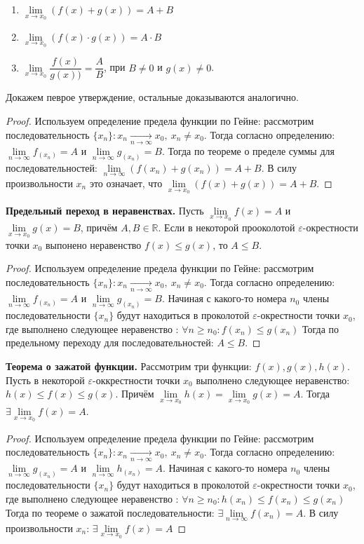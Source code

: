 \documentclass[12pt]{article}
\begin{document}
\begin{enumerate}
    \item $\lim\limits_{x \to x_0} (f(x) + g(x)) = A + B$
    \item $\lim\limits_{x \to x_0} (f(x) \cdot g(x)) = A \cdot B$
    \item $\lim\limits_{x \to x_0} \dfrac{f(x)}{g(x))} = \dfrac AB$, при $B \neq 0$ и $g(x) \neq 0$.
\end{enumerate}
Докажем певрое утверждение, остальные доказываются аналогично.
\begin{proof}
    Используем определение предела функции по Гейне: рассмотрим последовательность $\{x_n\} : x_n \xrightarrow[n \to \infty]{} x_0, \ x_n \neq x_0$. Тогда согласно определению: $\lim\limits_{n \to \infty} f_(x_n) = A$ и $\lim\limits_{n \to \infty} g_(x_n) = B$. Тогда по теореме о пределе суммы для последовательностей: $\lim\limits_{n \to \infty} \left(f(x_n) + g(x_n)\right) = A + B$. В силу произвольности $x_n$ это означает, что $\lim\limits_{x \to x_0} \left(f(x) + g(x) \right) = A + B$.
\end{proof}
\textbf{Предельный переход в неравенствах.} Пусть $\lim\limits_{x \to x_0} f(x) = A$ и $\lim\limits_{x \to x_0} g(x) = B$, причём $A, B \in \mathbb{R}$. Если в некоторой прооколотой $\varepsilon$-окрестности точки $x_0$ выпонено неравенство $f(x) \leq g(x)$, то $A \leq B$. 
\begin{proof}
    Используем определение предела функции по Гейне: рассмотрим последовательность $\{x_n\} : x_n \xrightarrow[n \to \infty]{} x_0, \ x_n \neq x_0$. Тогда согласно определению: $\lim\limits_{n \to \infty} f_(x_n) = A$ и $\lim\limits_{n \to \infty} g_(x_n) = B$. Начиная с какого-то номера $n_0$ члены последовательности $\{x_n\}$ будут находиться в проколотой $\varepsilon$-окрестности точки $x_0$, где выполнено следующее неравенство : $\forall n \geq n_0 : f(x_n) \leq g(x_n) $  Тогда по предельному переходу для последовательностей: $A \leq B$.
\end{proof}
\textbf{Теорема о зажатой функции.} Рассмотрим три функции: $f(x), g(x), h(x)$. Пусть в некоторой $\varepsilon$-оккрестности точки $x_0$ выполнено следующее неравенство: $h(x) \leq f(x) \leq g(x)$. Причём $\lim\limits_{x \to x_0} h(x) = \lim\limits_{x \to x_0} g(x) = A$. Тогда $\exists\lim\limits_{x \to x_0} f(x) = A$.
\begin{proof}
    Используем определение предела функции по Гейне: рассмотрим последовательность $\{x_n\} : x_n \xrightarrow[n \to \infty]{} x_0, \ x_n \neq x_0$. Тогда согласно определению: $\lim\limits_{n \to \infty} g_(x_n) = A$ и $\lim\limits_{n \to \infty} h_(x_n) = A$. Начиная с какого-то номера $n_0$ члены последовательности $\{x_n\}$ будут находиться в проколотой $\varepsilon$-окрестности точки $x_0$, где выполнено следующее неравенство : $\forall n \geq n_0 : h(x_n) \leq f(x_n) \leq g(x_n) $  Тогда по теореме о зажатой последовательности: $\exists \lim\limits_{n \to \infty} f(x_n) = A$. В силу произвольности $x_n$: $\exists \lim\limits_{x \to x_0} f(x) = A$
\end{proof}
\end{document}
